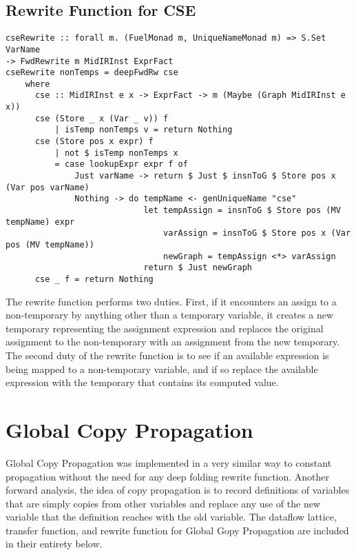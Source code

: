 \documentclass[11pt]{article}
\begin{document}
\subsection {Rewrite Function for CSE}

{\small\begin{verbatim}
cseRewrite :: forall m. (FuelMonad m, UniqueNameMonad m) => S.Set VarName 
-> FwdRewrite m MidIRInst ExprFact 
cseRewrite nonTemps = deepFwdRw cse 
    where 
      cse :: MidIRInst e x -> ExprFact -> m (Maybe (Graph MidIRInst e x))
      cse (Store _ x (Var _ v)) f
          | isTemp nonTemps v = return Nothing 
      cse (Store pos x expr) f 
          | not $ isTemp nonTemps x
          = case lookupExpr expr f of 
              Just varName -> return $ Just $ insnToG $ Store pos x (Var pos varName)
              Nothing -> do tempName <- genUniqueName "cse"
                            let tempAssign = insnToG $ Store pos (MV tempName) expr
                                varAssign = insnToG $ Store pos x (Var pos (MV tempName)) 
                                newGraph = tempAssign <*> varAssign 
                            return $ Just newGraph
      cse _ f = return Nothing
\end{verbatim}}

The rewrite function performs two duties. First, if it encounters an assign to a non-temporary by anything other than a temporary variable, it creates a new temporary representing the assignment expression and replaces the original assignment to the non-temporary with an assignment from the new temporary. The second duty of the rewrite function is to see if an available expression is being mapped to a non-temporary variable, and if so replace the available expression with the temporary that contains its computed value.

\section {Global Copy Propagation}
\label{sec:copyprop}

Global Copy Propagation was implemented in a very similar way to constant propagation without the need for any deep folding rewrite function. Another forward analysis, the idea of copy propagation is to record definitions of variables that are simply copies from other variables and replace any use of the new variable that the definition reaches with the old variable. The dataflow lattice, transfer function, and rewrite function for Global Gopy Propagation are included in their entirety below. 
\end{document}
